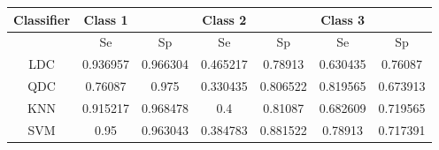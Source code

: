 \begin{tabular}{|c|c|c|c|c|c|c|}
 \hline 
Classifier & Class 1 &  & Class 2 &  & Class 3 &  \\ 
 \hline 
 & Se & Sp & Se & Sp & Se & Sp \\ 
 \hline 
LDC & 0.936957 & 0.966304 & 0.465217 & 0.78913 & 0.630435 & 0.76087 \\ 
 \hline 
QDC & 0.76087 & 0.975 & 0.330435 & 0.806522 & 0.819565 & 0.673913 \\ 
 \hline 
KNN & 0.915217 & 0.968478 & 0.4 & 0.81087 & 0.682609 & 0.719565 \\ 
 \hline 
SVM & 0.95 & 0.963043 & 0.384783 & 0.881522 & 0.78913 & 0.717391 \\ 
 \hline 
\end{tabular}
